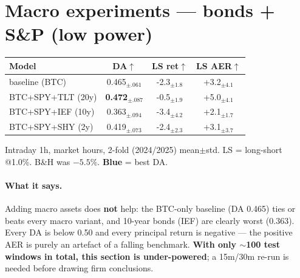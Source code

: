 \documentclass[11pt]{article}
\newcommand{\bb}[1]{\textcolor{best}{\textbf{#1}}}
\begin{document}
\section*{Macro experiments --- bonds + S\&P (low power)}
\begin{table}[h]\centering
\begin{tabular}{lccc}
\toprule
\textbf{Model} & \textbf{DA}$\uparrow$ & \textbf{LS ret}$\uparrow$ & \textbf{LS AER}$\uparrow$ \\
\midrule
baseline (BTC) & 0.465$_{\pm.061}$ & -2.3$_{\pm1.8}$ & +3.2$_{\pm4.1}$ \\
BTC+SPY+TLT (20y) & \bb{0.472$_{\pm.087}$} & -0.5$_{\pm1.9}$ & +5.0$_{\pm4.1}$ \\
BTC+SPY+IEF (10y) & 0.363$_{\pm.094}$ & -3.4$_{\pm4.2}$ & +2.1$_{\pm1.7}$ \\
BTC+SPY+SHY (2y) & 0.419$_{\pm.073}$ & -2.4$_{\pm2.3}$ & +3.1$_{\pm3.7}$ \\
\bottomrule\end{tabular}
\par\smallskip\footnotesize Intraday 1h, market hours, 2-fold (2024/2025) mean$\pm$std. LS = long-short @1.0\%. B\&H was $-5.5\%$. \bb{Blue} = best DA.
\end{table}
\paragraph{What it says.} Adding macro assets does \textbf{not} help: the BTC-only baseline (DA 0.465) ties or beats every macro variant, and 10-year bonds (IEF) are clearly worst (0.363). Every DA is below 0.50 and every principal return is negative --- the positive AER is purely an artefact of a falling benchmark. \textbf{With only $\sim$100 test windows in total, this section is under-powered}; a 15m/30m re-run is needed before drawing firm conclusions.
\end{document}
